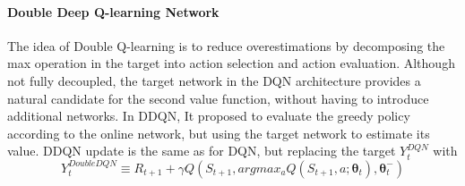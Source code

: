 \paragraph{Double Deep Q-learning Network} The idea of Double Q-learning\cite{van2016deep} is to reduce overestimations by decomposing the max operation in the target into action selection and action evaluation. Although not fully decoupled, the target network in the DQN architecture provides a natural candidate for the second value function, without having to introduce additional networks. In DDQN, It proposed to evaluate the greedy policy according to the online network, but using the target network to estimate its value. DDQN update is the same as for DQN, but replacing the target $Y_{t}^{DQN}$ with
\begin{equation}
Y_{t}^{DoubleDQN} \equiv R_{t+1} + \gamma Q(S_{t+1}, argmax_{a}Q(S_{t+1},a;\bm{\theta}_{t}), \bm{\theta}_{t}^{-})
\end{equation}

